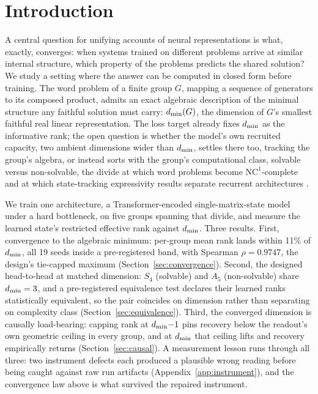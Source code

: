 \section{Introduction}
\label{sec:intro}

A central question for unifying accounts of neural representations is
what, exactly, converges: when systems trained on different problems
arrive at similar internal structure, which property of the problems
predicts the shared solution? We study a setting where the answer can be
computed in closed form before training. The word problem of a finite
group $G$, mapping a sequence of generators to its composed product,
admits an exact algebraic description of the minimal structure any
faithful solution must carry: $d_{\min}(G)$, the dimension of $G$'s smallest
faithful real linear representation. The loss target already fixes
$d_{\min}$ as the informative rank; the open question is whether the model's
own recruited capacity, two ambient dimensions wider than $d_{\min}$,
settles there too, tracking the group's algebra, or instead sorts with
the group's computational class,
solvable versus non-solvable, the divide at which word problems become
$\mathrm{NC}^1$-complete \citep{barrington1989} and at which
state-tracking expressivity results separate recurrent architectures
\citep{merrill2024illusion, grazzi2025negative}.

We train one architecture, a Transformer-encoded single-matrix-state
model under a hard bottleneck, on five groups spanning that divide, and
measure the learned state's restricted effective rank against $d_{\min}$.
Three results. First, convergence to the algebraic minimum: per-group
mean rank lands within 11\% of $d_{\min}$, all 19 seeds inside a
pre-registered band, with Spearman $\rho = 0.9747$, the design's
tie-capped maximum (Section~\ref{sec:convergence}).
Second, the designed
head-to-head at matched dimension: $S_4$ (solvable) and $A_5$
(non-solvable) share $d_{\min} = 3$, and a pre-registered equivalence test
declares their learned ranks statistically equivalent, so the pair
coincides on dimension rather than separating on complexity class
(Section~\ref{sec:equivalence}).
Third, the converged
dimension is causally load-bearing: capping rank at $d_{\min}{-}1$ pins
recovery below the readout's own geometric ceiling in every group, and
at $d_{\min}$ that ceiling lifts and recovery empirically returns
(Section~\ref{sec:causal}).
A measurement lesson runs
through all three: two instrument defects each produced a plausible
wrong reading before being caught against raw run artifacts
(Appendix~\ref{app:instrument}), and the convergence law above is what
survived the repaired instrument.
